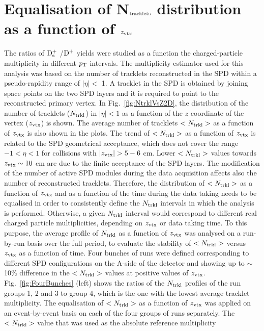 \section{Equalisation of N$_{\rm tracklets}$ distribution as a function of $z_{\rm vtx}$}
\label{sec:zVxtEq}
The ratios of ${\rm D_s^+}$ /${\rm D^+}$ yields were studied as a 
function the charged-particle multiplicity in different $p_{\rm T}$ intervals.
The multiplicity estimator used for this analysis was based on the number 
of tracklets reconstructed in the SPD within a 
pseudo-rapidity range of $|\eta| <$ 1. A tracklet in the SPD is obtained by
joining space points on the two SPD layers and it is required to point to 
the reconstructed primary vertex. 
In Fig.~\ref{fig:NtrklVsZ2D}, the distribution of the number of tracklets ($N_{\rm trkl}$) in $|\eta|<1$ as a function
of the $z$ coordinate of the vertex ($z_{\rm vtx}$) is shown.
 The average number of tracklets $<N_{\rm trkl}>$ as a function of $z_{\rm vtx}$ is also shown in the plots.
 The trend of $<N_{\rm trkl}>$ as a function of $z_{\rm vtx}$ is related to the SPD geometrical acceptance,
 which does not cover the range $-1 < \eta < 1$ for collisions with $|\zVtx|> 5-6$ cm.
 Lower $<N_{\rm trkl}>$ values towards $z_{\rm vtx} \sim 10 $ cm are due to the 
 finite acceptance of the SPD layers. 
The modification of the number of active SPD modules during the data acquisition 
 affects also the number of reconstructed tracklets.
 Therefore, the distribution of $<N_{\rm trkl}>$ as a function of $z_{\rm vtx}$ and as a function of the time
 during the data taking needs to be equalised 
in order to consistently define the $N_{\rm trkl}$ intervals in which the analysis is performed.
Otherwise, a given $N_{\rm trkl}$ interval would correspond to different real charged particle
multiplicities, depending on $z_{\rm vtx}$ or data taking time.
To this purpose, the average profile of $N_{\rm trkl}$ as a function of $z_{\rm vtx}$ was analysed on a run-by-run basis 
over the full period, to evaluate the stability of $<N_{\rm trkl}>$ versus $z_{\rm vtx}$ 
as a function of time. Four bunches of runs were defined corresponding to different SPD
configurations on the A-side of the detector and showing up to $\sim$10\% difference in the $<N_{\rm trkl}>$ values at positive values 
of $z_{\rm vtx}$. Fig.~\ref{fig:FourBunches} (left) shows the ratios of the $N_{\rm trkl}$ profiles
of the run groups 1, 2 and 3 to group 4, which is the one with the lowest average tracklet multiplicity.
 The equalisation of $<N_{\rm trkl}>$ as a function of $z_{\rm vtx}$ was applied on an 
 event-by-event basis on each of the four groups of runs separately.
The $<N_{\rm trkl}>$ value that was used as the absolute reference multiplicity 
